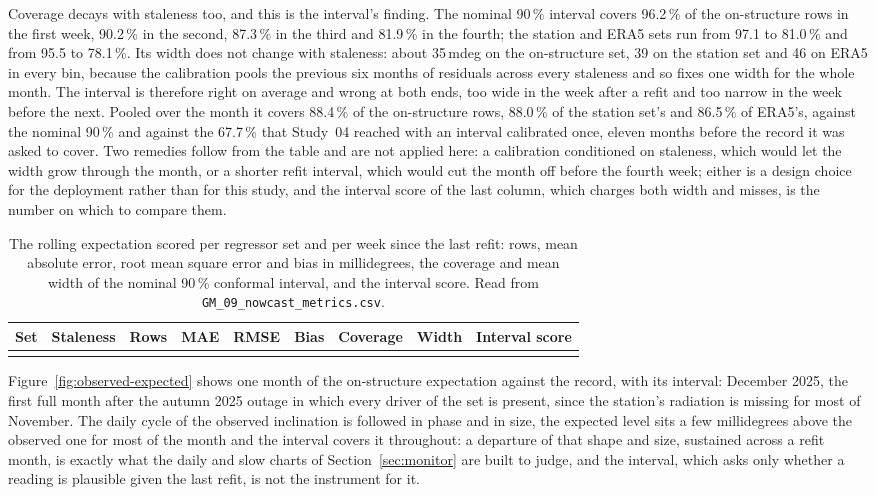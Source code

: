 \documentclass[11pt,a4paper]{article}
\begin{document}
Coverage decays with staleness too, and this is the interval's finding. The
nominal 90\,\% interval covers 96.2\,\% of the on-structure rows in the first
week, 90.2\,\% in the second, 87.3\,\% in the third and 81.9\,\% in the fourth;
the station and ERA5 sets run from 97.1 to 81.0\,\% and from 95.5 to 78.1\,\%.
Its width does not change with staleness: about 35\,mdeg on the on-structure
set, 39 on the station set and 46 on ERA5 in every bin, because the
calibration pools the previous six months of residuals across every
staleness and so fixes one width for the whole month. The interval is
therefore right on average and wrong at both ends, too wide in the week after
a refit and too narrow in the week before the next. Pooled over the month it
covers 88.4\,\% of the on-structure rows, 88.0\,\% of the station set's and
86.5\,\% of ERA5's, against the nominal 90\,\% and against the 67.7\,\% that
Study~04 reached with an interval calibrated once, eleven months before the
record it was asked to cover. Two remedies follow from the table and are not
applied here: a calibration conditioned on staleness, which would let the
width grow through the month, or a shorter refit interval, which would cut
the month off before the fourth week; either is a design choice for the
deployment rather than for this study, and the interval score of the last
column, which charges both width and misses, is the number on which to
compare them.

\begin{table}[H]
\centering
\caption{The rolling expectation scored per regressor set and per week since
the last refit: rows, mean absolute error, root mean square error and bias in
millidegrees, the coverage and mean width of the nominal 90\,\% conformal
interval, and the interval score. Read from
\texttt{GM\_09\_nowcast\_metrics.csv}.}
\label{tab:nowcast}
{\small\setlength{\tabcolsep}{4.5pt}
\begin{tabular}{llrrrrrrr}
\toprule
Set & Staleness & Rows & MAE & RMSE & Bias & Coverage & Width & Interval score \\
\midrule
\\
\bottomrule
\end{tabular}}
\end{table}

Figure~\ref{fig:observed-expected} shows one month of the on-structure
expectation against the record, with its interval: December 2025, the first
full month after the autumn 2025 outage in which every driver of the set is
present, since the station's radiation is missing for most of November. The daily
cycle of the observed inclination is followed in phase and in size, the
expected level sits a few millidegrees above the observed one for most of the
month and the interval covers it throughout: a departure of that shape and
size, sustained across a refit month, is exactly what the daily and slow
charts of Section~\ref{sec:monitor} are built to judge, and the interval,
which asks only whether a reading is plausible given the last refit, is not
the instrument for it.
\end{document}
